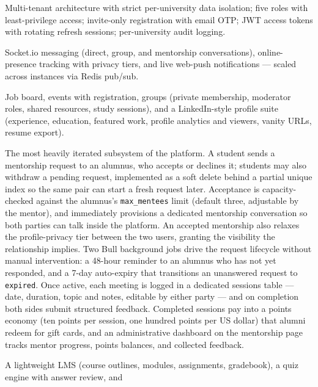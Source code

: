 \documentclass[11pt, a4paper]{article}
\begin{document}
\begin{description}[leftmargin=1.5em, itemsep=2pt]
    \item[Platform \& security] Multi-tenant architecture with strict
    per-university data isolation; five roles with least-privilege access;
    invite-only registration with email OTP; JWT access tokens with rotating
    refresh sessions; per-university audit logging.
    \item[Real-time layer] Socket.io messaging (direct, group, and mentorship
    conversations), online-presence tracking with privacy tiers, and live
    web-push notifications --- scaled across instances via Redis pub/sub.
    \item[Career \& community] Job board, events with registration, groups
    (private membership, moderator roles, shared resources, study sessions),
    and a LinkedIn-style profile suite (experience, education, featured work,
    profile analytics and viewers, vanity URLs, resume export).
    \item[Mentorship economy] The most heavily iterated subsystem of the
    platform. A student sends a mentorship request to an alumnus, who accepts
    or declines it; students may also withdraw a pending request, implemented
    as a soft delete behind a partial unique index so the same pair can start
    a fresh request later. Acceptance is capacity-checked against the
    alumnus's \texttt{max\_mentees} limit (default three, adjustable by the
    mentor), and immediately provisions a dedicated mentorship conversation
    so both parties can talk inside the platform. An accepted mentorship also
    relaxes the profile-privacy tier between the two users, granting the
    visibility the relationship implies. Two Bull background jobs drive the
    request lifecycle without manual intervention: a 48-hour reminder to an
    alumnus who has not yet responded, and a 7-day auto-expiry that
    transitions an unanswered request to \texttt{expired}. Once active, each
    meeting is logged in a dedicated sessions table --- date, duration, topic
    and notes, editable by either party --- and on completion both sides
    submit structured feedback. Completed sessions pay into a points economy
    (ten points per session, one hundred points per US dollar) that alumni
    redeem for gift cards, and an administrative dashboard on the mentorship
    page tracks mentor progress, points balances, and collected feedback.
    \item[Academic tools] A lightweight LMS (course outlines, modules,
    assignments, gradebook), a quiz engine with answer review, and

\end{description}
\end{document}
